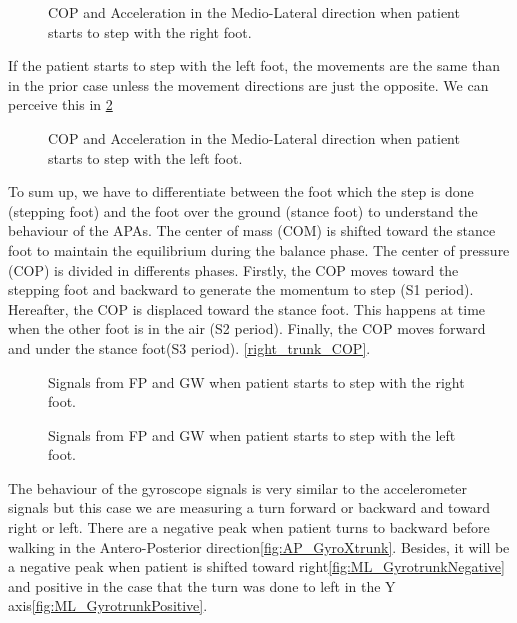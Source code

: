 \begin{figure}[H]
	\centering
	\caption{COP and Acceleration in the Medio-Lateral direction when patient starts to step with the right foot.}
	\label{fig:ML_AccYtrunkNegative}
\end{figure}

If the patient starts to step with the left foot, the movements are the same than in the prior case unless the movement directions are just the opposite. We can perceive this in \ref{fig:ML_AccYtrunkPositive}

\begin{figure}[H]
	\centering
	\caption{COP and Acceleration in the Medio-Lateral direction when patient starts to step with the left foot.}
\label{fig:ML_AccYtrunkPositive}
\end{figure}

To sum up, we have to differentiate between the foot which the step is done (stepping foot) and the foot over the ground (stance foot) to understand the behaviour of the APAs. The center of mass (COM) is shifted toward the stance foot to maintain the equilibrium during the balance phase. The center of pressure (COP) is divided in differents phases. Firstly, the COP moves toward the stepping foot and backward to generate the momentum to step (S1 period). Hereafter, the COP is displaced toward the stance foot. This happens at time when the other foot is in the air (S2 period). Finally, the COP moves forward and under the stance foot(S3 period). \ref{right_trunk_COP}. 
 
                 
\begin{figure}[H]
	\centering
	\caption{Signals from FP and GW when patient starts to step with the right foot.}
	\label{fig:right_trunk_COP}
\end{figure}

\begin{figure}[H]
	\centering
	\caption{Signals from FP and GW when patient starts to step with the left foot.}
	\label{fig:left_trunk_COP}
\end{figure}

The behaviour of the gyroscope signals is very similar to the accelerometer signals but this case we are measuring a turn forward or backward and toward right or left. There are a negative peak when patient turns to backward before walking in the Antero-Posterior direction\ref{fig:AP_GyroXtrunk}. Besides, it will be a negative peak when patient is shifted toward right\ref{fig:ML_GyrotrunkNegative} and positive in the case that the turn was done to left in the Y axis\ref{fig:ML_GyrotrunkPositive}.

